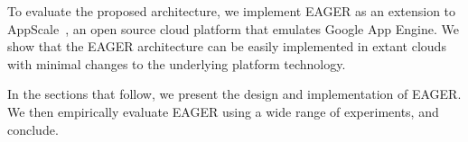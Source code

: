 To evaluate the proposed 
architecture, we implement EAGER as an extension to AppScale~\cite{appscale13}, 
an open source
cloud platform that emulates Google App Engine. We show that the EAGER 
architecture can be easily implemented in extant clouds with
minimal changes to the underlying platform technology. 

In the sections that follow, we present the design and implementation of
EAGER. We then empirically evaluate EAGER using a wide range of
experiments, and conclude.
